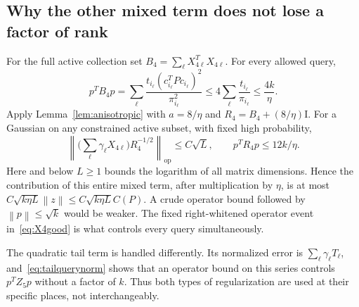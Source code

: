 \documentclass[11pt]{article}
\theoremstyle{remark}\newtheorem{remark}[theorem]{Remark}
\newcommand{\op}{\mathrm{op}}\newcommand{\Frob}{\mathrm F}
\newcommand{\norm}[1]{\left\lVert#1\right\rVert}\newcommand{\abs}[1]{\left|#1\right|}
\newcommand{\Id}{\mathrm I}\newcommand{\dbar}{\bar d}
\numberwithin{equation}{section}
\begin{document}
\subsection{Why the other mixed term does not lose a factor of rank}
For the full active collection set $B_4=\sum_\ell X_{4\ell}^TX_{4\ell}$. For every allowed query,
\begin{equation}\label{eq:B4query}
 p^TB_4p
 =\sum_\ell\frac{t_{i_\ell}(c_{i_\ell}^TPc_{i_\ell})^2}{\pi_{i_\ell}^2}
 \le4\sum_\ell\frac{t_{i_\ell}}{\pi_{i_\ell}}
 \le\frac{4k}{\eta}.
\end{equation}
Apply Lemma~\ref{lem:anisotropic} with $a=8/\eta$ and $R_4=B_4+(8/\eta)\Id$. For a Gaussian on any constrained active subset, with fixed high probability,
\begin{equation}\label{eq:X4good}
 \norm{\Big(\sum_\ell\gamma_\ell X_{4\ell}\Big)R_4^{-1/2}}_\op\le C\sqrt L,
 \qquad p^TR_4p\le12k/\eta.
\end{equation}
Here and below $L\ge1$ bounds the logarithm of all matrix dimensions. Hence the contribution of this entire mixed term, after multiplication by $\eta$, is at most
$C\sqrt{k\eta L}\norm z\le C\sqrt{k\eta L}C(P)$.
A crude operator bound followed by $\norm p\le\sqrt k$ would be weaker. The fixed right-whitened operator event in~\eqref{eq:X4good} is what controls every query simultaneously.

The quadratic tail term is handled differently. Its normalized error is $\sum_\ell\gamma_\ell T_\ell$, and~\eqref{eq:tailquerynorm} shows that an operator bound on this series controls $p^TZ_5p$ without a factor of $k$. Thus both types of regularization are used at their specific places, not interchangeably.
\end{document}
